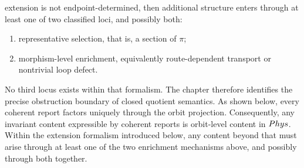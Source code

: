 extension is not endpoint-determined, then additional structure enters
through at least one of two classified loci, and possibly both:
\begin{enumerate}[label=\textup{(\roman*)}]
	\item representative selection, that is, a section of \(\pi\);
	\item morphism-level enrichment, equivalently route-dependent transport
	      or nontrivial loop defect.
\end{enumerate}
No third locus exists within that formalism.
The chapter therefore identifies the precise obstruction boundary of
closed quotient semantics. As shown below, every coherent report factors
uniquely through the orbit projection. Consequently, any invariant
content expressible by coherent reports is orbit-level content in
\(Phys\). Within the extension formalism introduced below, any content
beyond that must arise through at least one of the two enrichment
mechanisms above, and possibly through both together.
